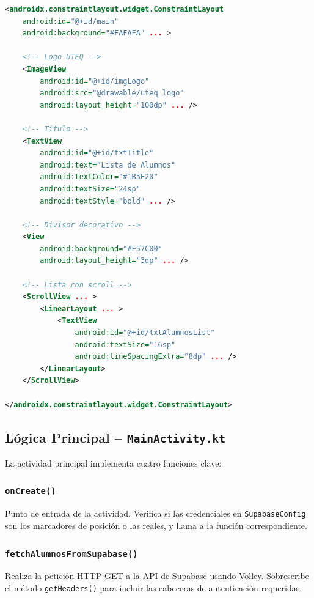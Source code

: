 \documentclass[12pt]{article}
\begin{document}
\begin{lstlisting}[language=XML, caption={activity\_main.xml (estructura principal)}]
<androidx.constraintlayout.widget.ConstraintLayout
    android:id="@+id/main"
    android:background="#FAFAFA" ... >

    <!-- Logo UTEQ -->
    <ImageView
        android:id="@+id/imgLogo"
        android:src="@drawable/uteq_logo"
        android:layout_height="100dp" ... />

    <!-- Titulo -->
    <TextView
        android:id="@+id/txtTitle"
        android:text="Lista de Alumnos"
        android:textColor="#1B5E20"
        android:textSize="24sp"
        android:textStyle="bold" ... />

    <!-- Divisor decorativo -->
    <View
        android:background="#F57C00"
        android:layout_height="3dp" ... />

    <!-- Lista con scroll -->
    <ScrollView ... >
        <LinearLayout ... >
            <TextView
                android:id="@+id/txtAlumnosList"
                android:textSize="16sp"
                android:lineSpacingExtra="8dp" ... />
        </LinearLayout>
    </ScrollView>

</androidx.constraintlayout.widget.ConstraintLayout>
\end{lstlisting}

\subsection{Lógica Principal -- \texttt{MainActivity.kt}}

La actividad principal implementa cuatro funciones clave:

\subsubsection{\texttt{onCreate()}}
Punto de entrada de la actividad. Verifica si las credenciales en \texttt{SupabaseConfig} son los marcadores de posición o las reales, y llama a la función correspondiente.

\subsubsection{\texttt{fetchAlumnosFromSupabase()}}
Realiza la petición HTTP GET a la API de Supabase usando Volley. Sobrescribe el método \texttt{getHeaders()} para incluir las cabeceras de autenticación requeridas.
\end{document}

